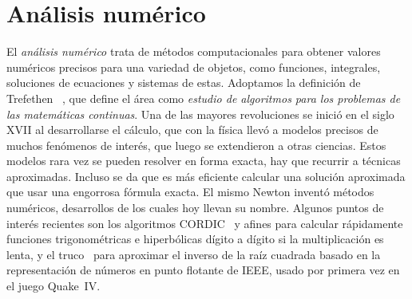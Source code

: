 

\chapter{Análisis numérico}
\label{cha:analisis-numerico}

  El \emph{análisis numérico} trata de métodos computacionales
  para obtener valores numéricos precisos para una variedad de objetos,
  como funciones, integrales, soluciones de ecuaciones y sistemas de estas.
  Adoptamos la definición de Trefethen~%
    \cite{trefethen92:_definition_numerical_analysis},
  que define el área como \emph{estudio de algoritmos para los problemas
  de las matemáticas continuas}.
  Una de las mayores revoluciones se inició en el siglo XVII
  al desarrollarse el cálculo,
  que con la física llevó a modelos precisos de muchos fenómenos de interés,
  que luego se extendieron a otras ciencias.
  Estos modelos rara vez se pueden resolver en forma exacta,
  hay que recurrir a técnicas aproximadas.
  Incluso se da que es más eficiente calcular una solución aproximada
  que usar una engorrosa fórmula exacta.
  El mismo Newton inventó métodos numéricos,
  desarrollos de los cuales hoy llevan su nombre.
  Algunos puntos de interés recientes son los algoritmos CORDIC~%
    \cite{volder59:_cordic_computing_techninque,
          volder59:_cordic_trigon_comput_techn}
  y afines para calcular rápidamente funciones trigonométricas e hiperbólicas
  dígito a dígito si la multiplicación es lenta,
  y el truco~%
    \cite{lomont03:_fast_inverse_square_root}
  para aproximar el inverso de la raíz cuadrada
  basado en la representación de números en punto flotante de IEEE,
  usado por primera vez en el juego Quake~IV.


